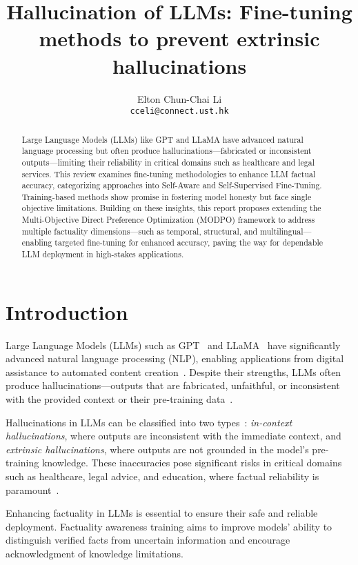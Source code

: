 \documentclass{article}
\title{Hallucination of LLMs: Fine-tuning methods to prevent extrinsic hallucinations}
\author{%
  Elton Chun-Chai Li \\
  \texttt{cceli@connect.ust.hk} \\
}
\begin{document}
\maketitle

\begin{abstract}
Large Language Models (LLMs) like GPT and LLaMA have advanced natural language processing but often produce hallucinations—fabricated or inconsistent outputs—limiting their reliability in critical domains such as healthcare and legal services. This review examines fine-tuning methodologies to enhance LLM factual accuracy, categorizing approaches into Self-Aware and Self-Supervised Fine-Tuning. Training-based methods show promise in fostering model honesty but face single objective limitations. Building on these insights, this report proposes extending the Multi-Objective Direct Preference Optimization (MODPO) framework to address multiple factuality dimensions—such as temporal, structural, and multilingual—enabling targeted fine-tuning for enhanced accuracy, paving the way for dependable LLM deployment in high-stakes applications.
\end{abstract}

\section{Introduction}
Large Language Models (LLMs) such as GPT~\cite{LanguageModelsAreFewShotLearners2020} and LLaMA~\cite{LLaMAOpenEfficientFoundationLanguage2023} have significantly advanced natural language processing (NLP), enabling applications from digital assistance to automated content creation~\cite{kaddourChallengesApplicationsLarge2023}. Despite their strengths, LLMs often produce hallucinations—outputs that are fabricated, unfaithful, or inconsistent with the provided context or their pre-training data~\cite{huangSurveyHallucinationLarge2023,rawteTroublingEmergenceHallucination2023,SurveyHallucinationNaturalLanguageGeneration2023}.

Hallucinations in LLMs can be classified into two types~\cite{weng2024hallucination}: \textit{in-context hallucinations}, where outputs are inconsistent with the immediate context, and \textit{extrinsic hallucinations}, where outputs are not grounded in the model's pre-training knowledge. These inaccuracies pose significant risks in critical domains such as healthcare, legal advice, and education, where factual reliability is paramount~\cite{kaddourChallengesApplicationsLarge2023}.

Enhancing factuality in LLMs is essential to ensure their safe and reliable deployment. Factuality awareness training aims to improve models' ability to distinguish verified facts from uncertain information and encourage acknowledgment of knowledge limitations.
\end{document}
